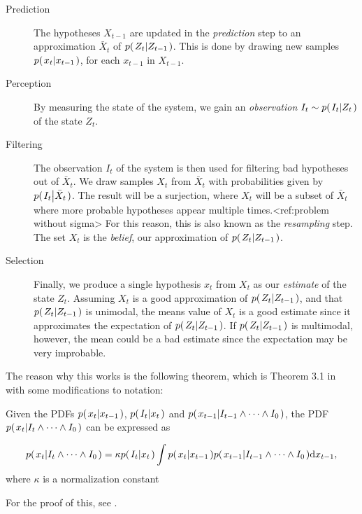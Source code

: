 \begin{description}
\item[Prediction] The hypotheses $X_{t-1}$ are updated in the
  \emph{prediction} step to an approximation $\bar{X}_t$ of
  $p{(\left. Z_t \middle\vert Z_{t-1} \right.)}$.  This is done by drawing new samples
  $p{(\left. x_t \middle\vert x_{t-1} \right.)}$, for each $x_{t-1}$ in $X_{t-1}$.
\item[Perception] By measuring the state of the system, we gain an
  \emph{observation} $I_t \sim p{(\left. I_t \middle\vert Z_t \right.)}$ of the state $Z_t$.
\item[Filtering] The observation $I_t$ of the system is then used for
  filtering bad hypotheses out of $\bar{X}_t$.  We draw samples $X_t$
  from $\bar{X}_t$ with probabilities given by
  $p{(\left. I_t \middle\vert \bar{X}_t \right.)}$. The result will be a surjection, where
  $X_t$ will be a subset of $\bar{X}_t$ where more probable hypotheses
  appear multiple times.<ref:problem without sigma> For this reason,
  this is also known as the \emph{resampling} step. The set $X_t$ is
  the \emph{belief}, our approximation of $p{(\left. Z_t \middle\vert Z_{t-1} \right.)}$.
\item[Selection] Finally, we produce a single hypothesis $x_t$ from
  $X_t$ as our \emph{estimate} of the state $Z_t$. Assuming $X_t$ is a
  good approximation of $p{(\left. Z_t \middle\vert Z_{t-1} \right.)}$, and that $p{(\left. Z_t \middle\vert Z_{t-1} \right.)}$ is
  unimodal, the means value of $X_t$ is a good estimate since it
  approximates the expectation of $p{(\left. Z_t \middle\vert Z_{t-1} \right.)}$.  If $p{(\left. Z_t \middle\vert Z_{t-1} \right.)}$
  is multimodal, however, the mean could be a bad estimate since the
  expectation may be very improbable.
\end{description}

The reason why this works is the following theorem, which is Theorem
3.1 in \cite{Hedvig} with some modifications to notation:

\begin{theorem}
  Given the PDFs $p{(\left. x_t \middle\vert x_{t-1} \right.)}$, $p{(\left. I_t \middle\vert x_t \right.)}$ and
  $p{(\left. x_{t-1} \middle\vert I_{t-1} \wedge \dots \wedge I_0 \right.)}$, the PDF
  $p{(\left. x_t \middle\vert I_t \wedge \dots \wedge I_0 \right.)}$ can be expressed as

\begin{equation}
  p{(\left. x_t \middle\vert I_t \wedge \dots \wedge I_0 \right.)} = \kappa p{(\left. I_t \middle\vert x_t \right.)} \int{ p{(\left. x_t \middle\vert x_{t-1} \right.)}p{(\left. x_{t-1} \middle\vert I_{t-1} \wedge \dots \wedge I_0 \right.)} \mathrm{d}x_{t-1}},
  \label{thm:pf-grand}
\end{equation}
where $\kappa$ is a normalization constant

For the proof of this, see \cite{Hedvig}.

\end{theorem}

